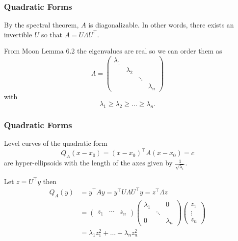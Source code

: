 \documentclass{beamer}
\begin{document}
\begin{frame}\frametitle{Quadratic Forms}
	By the spectral theorem, $A$ is diagonalizable.  In other words, there exists an invertible $U$ so that 
	$A = U\Lambda U^\top $.
	
	\vfill
	
	From Moon Lemma 6.2 the eigenvalues are real so we can order them as
	\[ 
		\Lambda 
			= \begin{pmatrix}
	    		\lambda_1\\
	    		& \lambda_2\\
	    		& & \ddots\\
	    		& & & \lambda_n
	  		   \end{pmatrix}
	\]
	with
	\[
	  	\lambda_1 \geq \lambda_2 \geq \ldots \geq \lambda_n.
	\]
\end{frame}

\begin{frame}\frametitle{Quadratic Forms}
	\begin{lemma}
		Level curves of the quadratic form 
		\[
			Q_A(x-x_0) = (x-x_0)^\top A(x-x_0) = c
		\]
		are hyper-ellipsoids with the length of the axes given by $\frac{1}{\sqrt{\lambda_i}}$.	
	\end{lemma}
	\begin{proofstart}
		Let $z = U^\top y$ then
		\begin{align*}
		 Q_A(y) &= y^\top Ay= y^\top U\Lambda U^\top y = z^\top \Lambda z \\
		 		&= \begin{pmatrix}
		     			z_1 & \cdots & z_n
			   	   \end{pmatrix}
			   	   \begin{pmatrix}
		     			\lambda_1 & & 0\\
		     			& \ddots\\
		     			0 & & \lambda_n
		   			\end{pmatrix}
		   			\begin{pmatrix}
		    			z_1 \\ \vdots \\ z_n
		  			\end{pmatrix} \\
		  		&= \lambda_1 z_1^2 + \dots + \lambda_n z_n^2
		\end{align*}
	\end{proofstart}
\end{frame}
\end{document}
